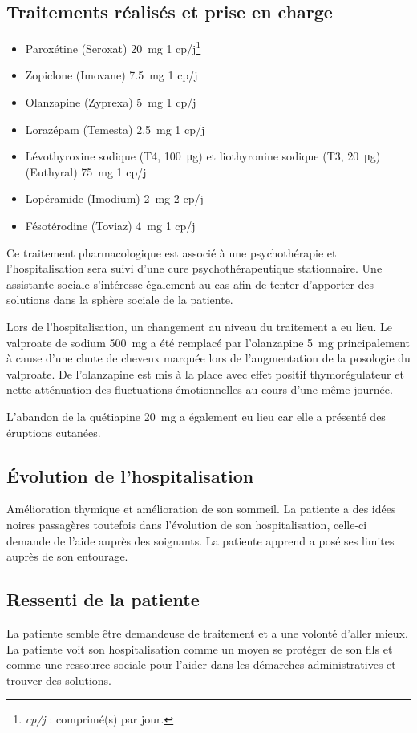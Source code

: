 \subsection{Traitements réalisés et prise en charge} 
\begin{itemize}[compact, label=\textbullet]
    \item Paroxétine (Seroxat)  \qty{20}{\mg} 1 cp/j\footnote{\textit{cp/j} : comprimé(s) par jour.}
    \item Zopiclone (Imovane) \qty{7.5}{\mg} 1 cp/j
    \item Olanzapine (Zyprexa) \qty{5}{\mg} 1 cp/j 
    \item Lorazépam (Temesta) \qty{2.5}{\mg} 1 cp/j
    \item Lévothyroxine sodique (T4, \qty{100}{\ug}) et liothyronine sodique (T3, \qty{20}{\ug}) (Euthyral) \qty{75}{\mg} 1 cp/j 
    \item Lopéramide (Imodium) \qty{2}{\mg} 2 cp/j
    \item Fésotérodine (Toviaz) \qty{4}{\mg} 1 cp/j 
\end{itemize}
 
Ce traitement pharmacologique est associé à une psychothérapie et l’hospitalisation sera suivi d’une cure psychothérapeutique stationnaire. 
Une assistante sociale s’intéresse également au cas afin de tenter d’apporter des solutions dans la sphère sociale de la patiente. 
 
Lors de l’hospitalisation, un changement au niveau du traitement a eu lieu. Le valproate de sodium \qty{500}{\mg} a été remplacé par l’olanzapine \qty{5}{\mg} principalement à cause d’une chute de cheveux marquée lors de l’augmentation de la posologie du valproate. De l’olanzapine est mis à la place avec effet positif thymorégulateur et nette atténuation des fluctuations émotionnelles au cours d’une même journée. 
 
L’abandon de la quétiapine \qty{20}{\mg} a également eu lieu car elle a présenté des éruptions cutanées. 

\subsection{Évolution de l’hospitalisation }
Amélioration thymique et amélioration de son sommeil. 
La patiente a des idées noires passagères toutefois dans l’évolution de son hospitalisation, celle-ci demande de l’aide auprès des soignants. 
La patiente apprend a posé ses limites auprès de son entourage. 

\subsection{Ressenti de la patiente}
La patiente semble être demandeuse de traitement et a une volonté d’aller mieux. La patiente voit son hospitalisation comme un moyen se protéger de son fils et comme une ressource sociale pour l’aider dans les démarches administratives et trouver des solutions.
 
